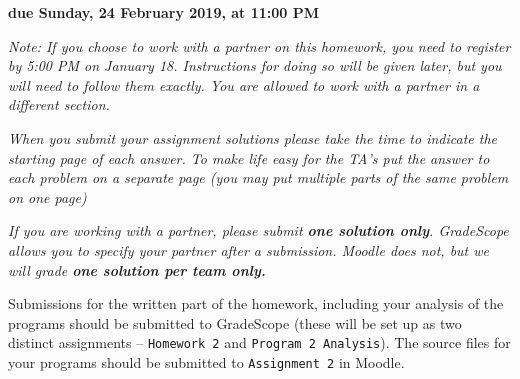 \documentclass{article}
\begin{document}

\begin{center}
  \textbf{due Sunday, 24 February 2019, at 11:00 PM}
\end{center}

\emph{Note: If you choose to work with a partner on this homework, you need
  to register by 5:00 PM on January 18.
  Instructions for doing so will be given later, but you will need to follow
  them exactly. You are allowed to work with a partner in a different section.}

\emph{When you submit your assignment solutions please take the time to
  indicate the starting page of each answer. To make life easy for the TA's
  put the answer to each problem on a separate page (you may put multiple
  parts of the same problem on one page)}

\emph{If you are working with a partner, please submit \textbf{one solution
    only}. GradeScope allows you to specify your partner after a
  submission. Moodle does not, but we will grade \textbf{one solution per
    team only.}}

Submissions for the written part of the homework, including your
analysis of the programs should be submitted to GradeScope (these will be
set up as two distinct assignments -- \texttt{Homework~2} and
\texttt{Program~2~Analysis}). The source
files for your programs should be submitted to \texttt{Assignment~2} in Moodle.
\end{document}
